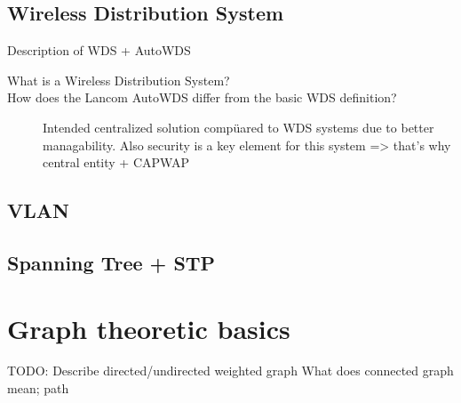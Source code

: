     \subsection{Wireless Distribution System}
    Description of WDS + AutoWDS \newline
      \begin{description}
       \item[What is a Wireless Distribution System?]
       \item[How does the Lancom AutoWDS differ from the basic WDS definition?]
	 Intended centralized solution compüared to WDS systems due to better managability.
	 Also security is a key element for this system => that's why central entity + CAPWAP
      \end{description}
      \subsection{VLAN}
      \subsection{Spanning Tree + STP}
\section{Graph theoretic basics}
  TODO: Describe directed/undirected weighted graph
  What does connected graph mean; path

